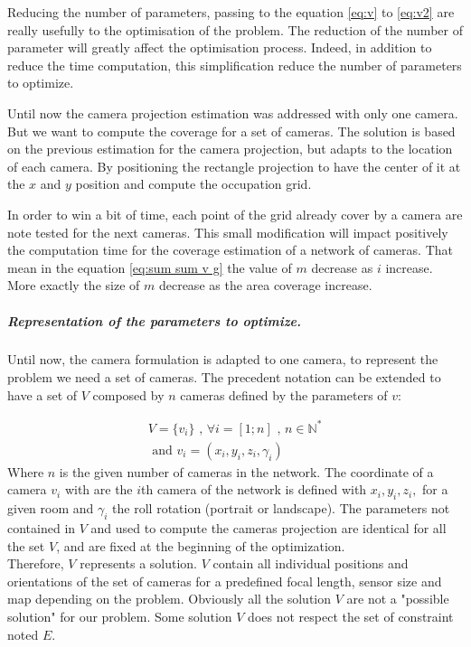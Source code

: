 Reducing the number of  parameters, passing to the equation \ref{eq:v} to \ref{eq:v2} are really usefully to the optimisation of the problem. The reduction of the number of parameter will greatly affect the optimisation process.
 Indeed, in addition to reduce the time computation, this simplification reduce the number of parameters to optimize.   

Until now the camera projection estimation  was addressed with only one camera. But we want to compute the coverage for a set of cameras. 
The solution is based on the previous estimation for the camera projection, but adapts to the location of each camera. By positioning the rectangle projection to have the center of it at the $x$ and $y$ position and compute the occupation grid.

In order to win a bit of time, each point of the grid already cover by a camera are note tested for the next cameras. This small modification will impact positively the computation time for the coverage estimation of a network of cameras. That mean in the equation \ref{eq:sum sum v g} the value of $m$ decrease as $i$ increase. More exactly the size of $m$ decrease as the area coverage increase.  


\subparagraph{Representation of the parameters to optimize. \\}

Until now, the camera formulation is adapted to one camera, to represent the problem we need a set of cameras. The precedent notation can be extended to have a set of $V$ composed by $n$ cameras defined by the parameters of $v$:

	\begin{equation}\label{eq:V}
		\begin{split}
			V= \{v_i\} \mbox{  , } \forall i=[1;n] \mbox{ , } n\in \mathbb{N}^*
				\\
			\mbox{ and } v_i= (x_i,y_i,z_i,\gamma_i)
		\end{split}
	\end{equation}
\noindent Where $n$ is the given number of cameras in the network. The coordinate of a camera $v_i$ with are the $i$th camera of the network is defined  with $x_i, y_i, z_i,$ for a given room and $\gamma_i$ the roll rotation (portrait or landscape). The parameters not contained in $V$ and used to compute the cameras projection are  identical for all the set $V$, and are fixed at the beginning of the optimization.\\
Therefore, $V$ represents a solution. $V$ contain all individual positions and orientations of the set of cameras for a predefined focal length, sensor size and map depending on the problem.%
Obviously all the solution $V$ are not a "possible solution" for our problem. Some solution $V$ does not respect the set of constraint noted $E$.

